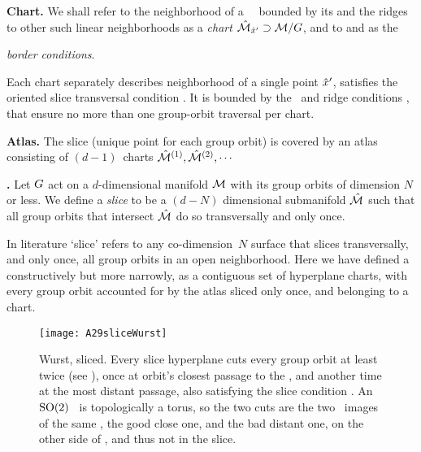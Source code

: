 \documentclass[aip,cha,reprint,
secnumarabic,
nofootinbib, tightenlines,
nobibnotes, showkeys, showpacs,
]{revtex4-1}
\begin{document}
\textbf{Chart.}
We shall refer to the neighborhood of a \template\ \slicep\ bounded by
its {\chartBord} and the ridges to other such linear neighborhoods as a
\emph{chart} $\hat{\cal M}_{{\hat{x}'}} \supset {\cal M}/G$, and to
 and  as the {\emph{border conditions}.

Each chart separately describes neighborhood of a single {\template}
point ${\hat{x}'}$, satisfies the oriented slice transversal condition
. It is bounded by the \chartBord\ and ridge conditions
,  that ensure no more than one
group-orbit traversal per chart.

\textbf{Atlas.}
The slice (unique point for each group orbit) is covered by an atlas
consisting of $(d\!-\!1)$\dmn\ charts $\hat{\cal M}{}^{(1)}, \hat{\cal M}{}^{(2)},
\cdots$

\textbf{\Slice.}
Let $G$ act on a $d$-dimensional manifold ${\cal M}$
with its group orbits of dimension $N$ or less. We define a \emph{slice}
to be a $(d\!-\!N)$ dimensional submanifold $\hat{\cal M}$ such that all group
orbits that intersect $\hat{\cal M}$ do so transversally and only once.

In literature `slice' refers to any co-dimension~$N$ surface
that slices transversally, and only once, all group orbits in an open
neighborhood. Here we have defined a
{\slice} constructively but more narrowly, as a contiguous set of
hyperplane charts, with every group orbit accounted for by the atlas
sliced only once, and belonging to a chart.


\begin{figure}
   \centering
\texttt{[image: A29sliceWurst]}
   \caption{\label{fig:sliceimage}
Wurst, sliced.
      Every slice hyperplane cuts every group orbit at least twice (see
      ), once at orbit's closest passage to the
      {\template}, and another time at the most distant passage, also
      satisfying the slice condition . An $\textrm{SO}(2)$ \rpo\
      is topologically a torus, so the two cuts are the two \po\ images
      of the same \rpo, the good close one, and the bad distant one, on
      the other side of {\sliceBord}, and thus not in the slice.
   }
\end{figure}

}
\end{document}
